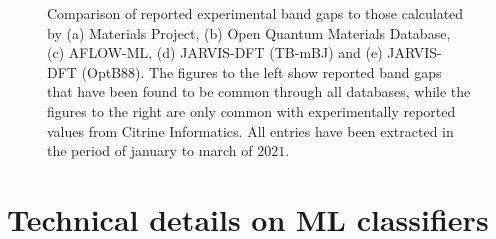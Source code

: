 \begin{figure}[t!]\ContinuedFloat
    \centering
    \begin{subfigure}[t]{1\textwidth}
        \centering
        
        \caption{}
    \end{subfigure}%

    \begin{subfigure}[t]{1\textwidth}
        \centering
        
        \caption{}
    \end{subfigure}
    \vspace*{-130mm}
    \caption{Comparison of reported experimental band gaps to those calculated by (a) Materials Project, (b) Open Quantum Materials Database, (c) AFLOW-ML, (d) JARVIS-DFT (TB-mBJ) and (e) JARVIS-DFT (OptB88). The figures to the left show reported band gaps that have been found to be common through all databases, while the figures to the right are only common with experimentally reported values from Citrine Informatics. All entries have been extracted in the period of january to march of $2021$. }
    \label{fig:band gaps}
\end{figure}

\clearpage

\section{Technical details on ML classifiers}


